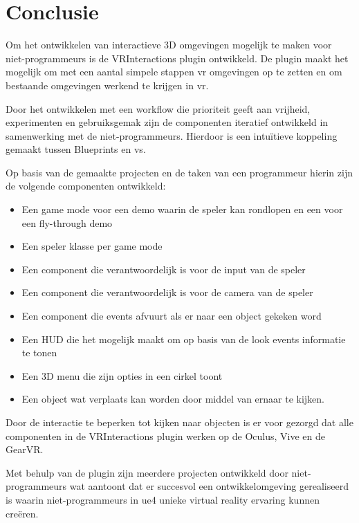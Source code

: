 \chapter{Conclusie}
\label{ch:conclusie}

Om het ontwikkelen van interactieve 3D omgevingen mogelijk te maken voor niet-programmeurs is de VRInteractions plugin ontwikkeld. De plugin maakt het mogelijk om met een aantal simpele stappen \gls{vr} omgevingen op te zetten en om bestaande omgevingen werkend te krijgen in \gls{vr}.

Door het ontwikkelen met een workflow die prioriteit geeft aan vrijheid, experimenten en gebruiksgemak zijn de componenten iteratief ontwikkeld in samenwerking met de niet-programmeurs. Hierdoor is een intuïtieve koppeling gemaakt tussen Blueprints en \gls{vs}.

Op basis van de gemaakte projecten en de taken van een programmeur hierin zijn de volgende componenten ontwikkeld:

\begin{itemize}
	\item Een game mode voor een demo waarin de speler kan rondlopen en een voor een fly-through demo
	\item Een speler klasse per game mode
	\item Een component die verantwoordelijk is voor de input van de speler
	\item Een component die verantwoordelijk is voor de camera van de speler
	\item Een component die events afvuurt als er naar een object gekeken word
	\item Een HUD die het mogelijk maakt om op basis van de look events informatie te tonen
	\item Een 3D menu die zijn opties in een cirkel toont
	\item Een object wat verplaats kan worden door middel van ernaar te kijken.
\end{itemize}

Door de interactie te beperken tot kijken naar objecten is er voor gezorgd dat alle componenten in de VRInteractions plugin werken op de Oculus, Vive en de GearVR.

Met behulp van de plugin zijn meerdere projecten ontwikkeld door niet-programmeurs wat aantoont dat er succesvol een ontwikkelomgeving gerealiseerd is waarin niet-programmeurs in \gls{ue4} unieke virtual reality ervaring kunnen creëren.